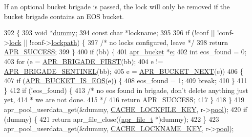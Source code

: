 If an optional bucket brigade is passed, the lock will only be removed if the bucket brigade contains an E\+OS bucket. 
\begin{DoxyCode}
392 \{
393     \textcolor{keywordtype}{void} *\hyperlink{group__APACHE__CORE__LISTEN_gafd856f29d11272d954fe05b9c1ca84dd}{dummy};
394     \textcolor{keyword}{const} \textcolor{keywordtype}{char} *lockname;
395 
396     \textcolor{keywordflow}{if} (!conf || !conf->\hyperlink{structcache__server__conf_ab459a77dbc1bbba26a954336d34d136e}{lock} || !conf->\hyperlink{structcache__server__conf_ab8f9316567111d3366fcc1edfaf0bc8c}{lockpath}) \{
397         \textcolor{comment}{/* no locks configured, leave */}
398         \textcolor{keywordflow}{return} \hyperlink{group__apr__errno_ga9ee311b7bf1c691dc521d721339ee2a6}{APR\_SUCCESS};
399     \}
400     \textcolor{keywordflow}{if} (bb) \{
401         \hyperlink{structapr__bucket}{apr\_bucket} *\hyperlink{group__APR__Util__Bucket__Brigades_gacd90314acb2c2e5cd19681136c08efac}{e};
402         \textcolor{keywordtype}{int} eos\_found = 0;
403         \textcolor{keywordflow}{for} (e = \hyperlink{group__APR__Util__Bucket__Brigades_gab5826a11eb6ba90786a94282f806c230}{APR\_BRIGADE\_FIRST}(bb);
404              e != \hyperlink{group__APR__Util__Bucket__Brigades_ga858da66dccab1e063415678bb115788a}{APR\_BRIGADE\_SENTINEL}(bb);
405              e = \hyperlink{group__APR__Util__Bucket__Brigades_ga7171f690b203d548a5b6ae0b079068d8}{APR\_BUCKET\_NEXT}(e))
406         \{
407             \textcolor{keywordflow}{if} (\hyperlink{group__APR__Util__Bucket__Brigades_ga89b225e1c08473766eec719b985ca0d6}{APR\_BUCKET\_IS\_EOS}(e)) \{
408                 eos\_found = 1;
409                 \textcolor{keywordflow}{break};
410             \}
411         \}
412         \textcolor{keywordflow}{if} (!eos\_found) \{
413             \textcolor{comment}{/* no eos found in brigade, don't delete anything just yet,}
414 \textcolor{comment}{             * we are not done.}
415 \textcolor{comment}{             */}
416             \textcolor{keywordflow}{return} \hyperlink{group__apr__errno_ga9ee311b7bf1c691dc521d721339ee2a6}{APR\_SUCCESS};
417         \}
418     \}
419     apr\_pool\_userdata\_get(&dummy, \hyperlink{group__Cache__util_ga18f46c3a4173d016f51fce82d596fec7}{CACHE\_LOCKFILE\_KEY}, r->\hyperlink{structrequest__rec_aa0a0c16f9a9ab3901cdb3f3c9c9d83d0}{pool});
420     \textcolor{keywordflow}{if} (dummy) \{
421         \textcolor{keywordflow}{return} apr\_file\_close((\hyperlink{structapr__file__t}{apr\_file\_t} *)dummy);
422     \}
423     apr\_pool\_userdata\_get(&dummy, \hyperlink{group__Cache__util_gaa55455b9316bd74826d36a89914580b8}{CACHE\_LOCKNAME\_KEY}, r->\hyperlink{structrequest__rec_aa0a0c16f9a9ab3901cdb3f3c9c9d83d0}{pool});

\end{DoxyCode}
